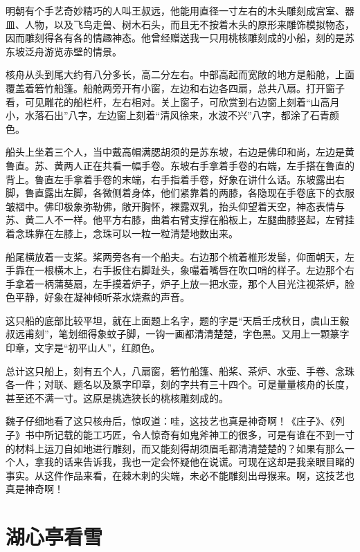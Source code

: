 \documentclass[12pt,UTF-8,openany,a4]{ctexbook}
\begin{document}
\begin{large}
    \yiwen 
    明朝有个手艺奇妙精巧的人叫王叔远，他能用直径一寸左右的木头雕刻成宫室、器皿、人物，以及飞鸟走兽、树木石头，而且无不按着木头的原形来雕饰模拟物态，因而雕刻得各有各的情趣神态。他曾经赠送我一只用桃核雕刻成的小船，刻的是苏东坡泛舟游览赤壁的情景。
    
    核舟从头到尾大约有八分多长，高二分左右。中部高起而宽敞的地方是船舱，上面覆盖着箬竹船篷。船舱两旁开有小窗，左边和右边各四扇，总共八扇。打开窗子看，可见雕花的船栏杆，左右相对。关上窗子，可欣赏到右边窗上刻着“山高月小，水落石出”八字，左边窗上刻着“清风徐来，水波不兴”八字，都涂了石青颜色。
    
    船头上坐着三个人，当中戴高帽满腮胡须的是苏东坡，右边是佛印和尚，左边是黄鲁直。苏、黄两人正在共看一幅手卷。东坡右手拿着手卷的右端，左手搭在鲁直的背上。鲁直左手拿着手卷的末端，右手指着手卷，好象在讲什么话。东坡露出右脚，鲁直露出左脚，各微侧着身体，他们紧靠着的两膝，各隐现在手卷底下的衣服皱褶中。佛印极象弥勒佛，敞开胸怀，裸露双乳，抬头仰望着天空，神态表情与苏、黄二人不一样。他平方右膝，曲着右臂支撑在船板上，左腿曲膝竖起，左臂挂着念珠靠在左膝上，念珠可以一粒一粒清楚地数出来。
    
    船尾横放着一支桨。桨两旁各有一个船夫。右边那个梳着椎形发髻，仰面朝天，左手靠在一根横木上，右手扳住右脚趾头，象嘬着嘴唇在吹口哨的样子。左边那个右手拿着一柄蒲葵扇，左手摸着炉子，炉子上放一把水壶，那个人目光注视茶炉，脸色平静，好象在凝神倾听茶水烧煮的声音。
    
    这只船的底部比较平坦，就在上面题上名字，题的字是“天启壬戌秋日，虞山王毅叔远甫刻”，笔划细得象蚊子脚，一钩一画都清清楚楚，字色黑。又用上一颗篆字印章，文字是“初平山人”，红颜色。
    
    总计这只船上，刻有五个人，八扇窗，箬竹船篷、船桨、茶炉、水壶、手卷、念珠各一件；对联、题名以及篆字印章，刻的字共有三十四个。可是量量核舟的长度，甚至还不满一寸。这原是挑选狭长的桃核雕刻成的。
    
    魏子仔细地看了这只核舟后，惊叹道：哇，这技艺也真是神奇啊！《庄子》、《列子》书中所记载的能工巧匠，令人惊奇有如鬼斧神工的很多，可是有谁在不到一寸的材料上运刀自如地进行雕刻，而又能刻得胡须眉毛都清清楚楚的？如果有那么一个人，拿我的话来告诉我，我也一定会怀疑他在说谎。可现在这却是我亲眼目睹的事实。从这件作品来看，在棘木刺的尖端，未必不能雕刻出母猴来。啊，这技艺也真是神奇啊！
    
\end{large}



\chapter{湖心亭看雪}
\end{document}

